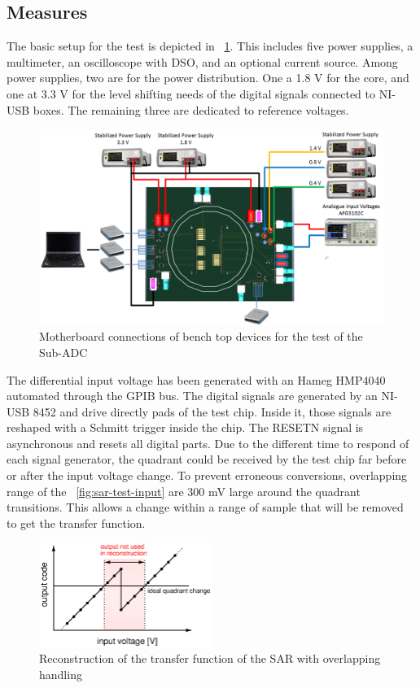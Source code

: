 \subsection{Measures}
The basic setup for the test is depicted in \figurename~\ref{fig:sar-test-connections}. This includes five power supplies, a multimeter, an oscilloscope with DSO, and an optional current source. Among power supplies, two are for the power distribution. One a 1.8 V for the core, and one at 3.3 V for the level shifting needs of the digital signals connected to NI-USB boxes. The remaining three are dedicated to reference voltages.

\begin{figure}[htp]
    \centering
    \includegraphics[width=.8\textwidth]{Chapter5/Figs/sar_test/board_test_setup.png}
    \caption{Motherboard connections of bench top devices for the test of the Sub-ADC}
    \label{fig:sar-test-connections}
\end{figure}

The differential input voltage has been generated with an Hameg HMP4040 automated through the GPIB bus. The digital signals are generated by an NI-USB 8452 and drive directly pads of the test chip. Inside it, those signals are reshaped with a Schmitt trigger inside the chip. The RESETN signal is asynchronous and resets all digital parts. Due to the different time to respond of each signal generator, the quadrant could be received by the test chip far before or after the input voltage change. To prevent erroneous conversions, overlapping range of the \figurename~\ref{fig:sar-test-input} are 300 mV large around the quadrant transitions. This allows a change within a range of sample that will be removed to get the transfer function.

\begin{figure}[htp]
    \centering
    \includegraphics[width=0.5\textwidth]{Chapter5/Figs/sar_test/sar-tf-overlapp.ps}
    \caption{Reconstruction of the transfer function of the SAR with overlapping handling}
    \label{fig:sar-tf-overlap}
\end{figure}

